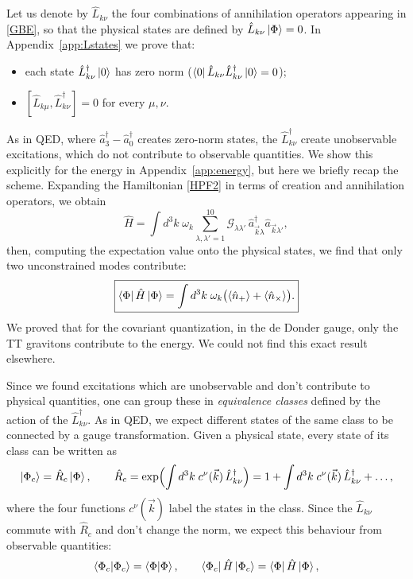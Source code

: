 \documentclass[12pt,a4paper,oneside]{article}
\numberwithin{equation}{section}   %
\begin{document}
Let us denote by $\hat L_{k\nu}$ the four combinations of annihilation operators
appearing in \eqref{GBE}, so that the physical states are defined by
$\hat L_{k\nu}\ket{\Phi}=0$. In Appendix~\ref{app:Lstates} we prove that:
\begin{itemize}
\item each state $\hat L^\dagger_{k\nu}\ket{0}$ has zero norm
($\bra{0}\hat L_{k\nu}\hat L^\dagger_{k\nu}\ket{0}=0$);
\item $[\hat L_{k\mu},\hat L^\dagger_{k\nu}]=0$ for every $\mu,\nu$.
\end{itemize}
As in QED, where $\hat a_3^\dagger-\hat a_0^\dagger$ creates zero-norm states,
the $\hat L^\dagger_{k\nu}$ create unobservable excitations, which do not
contribute to observable quantities. We show this explicitly for the energy in 
Appendix~\ref{app:energy}, but here we briefly recap the scheme.
Expanding the Hamiltonian \eqref{HPF2} in terms of creation and annihilation
operators, we obtain
\begin{equation}
\hat H=\int d^3k\;\omega_k\sum_{\lambda,\lambda'=1}^{10}
\mathcal G_{\lambda\lambda'}\,\hat a^\dagger_{\vec k\lambda}\hat a_{\vec k\lambda'} ,
\end{equation}
then, computing the expectation value onto the
physical states, we find that only two unconstrained modes contribute:
\begin{equation}
\boxed{
\bra{\Phi}\hat H\ket{\Phi}
=\int d^3k\;\omega_k\bigl(\langle\hat n_{+}\rangle+\langle\hat n_{\times}\rangle\bigr).}
\end{equation}
We proved that for the covariant quantization, in the de Donder gauge, only the TT
gravitons contribute to the energy. We could not find this exact result elsewhere.

Since we found excitations
which are unobservable and don't contribute to physical quantities, 
one can group these in \textit{equivalence classes} defined by
the action of the $\hat L^\dagger_{k\nu}$.
As in QED, we expect different states of the same class to be
connected by a gauge transformation.
Given a physical state, every state
of its class can be written as
\begin{equation}
    \ket{\Phi_c} = \hat{R}_c \ket{\Phi},\qquad
    \hat{R}_c=\exp\Bigl(\int d^3k\; c^\nu(\vec k)\, \hat{L}^\dagger_{k\nu}\Bigr)
    =1+\int d^3k\; c^\nu(\vec k)\, \hat{L}^\dagger_{k\nu}+\dots ,
\end{equation}
where the four functions $c^\nu(\vec k)$ label the states in the class.
Since the $\hat L_{k\nu}$ commute with $\hat R_c$
and don't change the norm, we expect this behaviour from
observable quantities:
\begin{equation}
\braket{\Phi_c}{\Phi_c}=\braket{\Phi}{\Phi},\qquad
\bra{\Phi_c}\hat H\ket{\Phi_c}=\bra{\Phi}\hat H\ket{\Phi },
\end{equation}
\end{document}
